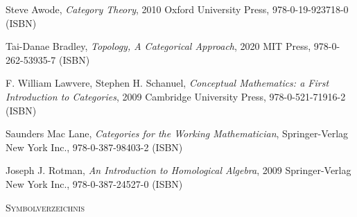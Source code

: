 \documentclass[a4paper]{amsart}
\theoremstyle{definition}
\begin{document}
\begin{thebibliography}{9}
      Steve Awode, \emph{Category Theory},
      2010 Oxford University Press, 978-0-19-923718-0 (ISBN)

      Tai-Danae Bradley, \emph{Topology, A Categorical Approach},
      2020 MIT Press, 978-0-262-53935-7 (ISBN)

      F. William Lawvere, Stephen H. Schanuel, \emph{Conceptual Mathematics: a First Introduction to Categories},
      2009 Cambridge University Press, 978-0-521-71916-2 (ISBN)

      Saunders Mac Lane, \emph{Categories for the Working Mathematician},
      Springer-Verlag New York Inc., 978-0-387-98403-2 (ISBN)

   	Joseph J. Rotman, \emph{An Introduction to Homological Algebra},
   	2009 Springer-Verlag New York Inc., 978-0-387-24527-0 (ISBN)
      
\end{thebibliography}

\begin{large}
    \centerline{\textsc{Symbolverzeichnis}}
\end{large}
\bigskip

\renewcommand*{\arraystretch}{1}
\end{document}

